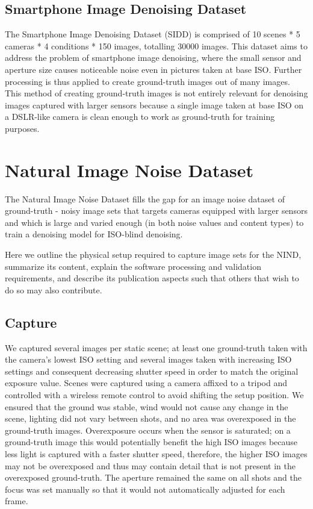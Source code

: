 \subsection{Smartphone Image Denoising Dataset}
The Smartphone Image Denoising Dataset (SIDD) \cite{sidd} is comprised of 10 scenes * 5 cameras * 4 conditions * 150 images, totalling 30000 images. This dataset aims to address the problem of smartphone image denoising, where the small sensor and aperture size causes noticeable noise even in pictures taken at base ISO. Further processing is thus applied to create ground-truth images out of many images. This method of creating ground-truth images is not entirely relevant for denoising images captured with larger sensors because a single image taken at base ISO on a DSLR-like camera is clean enough to work as ground-truth for training purposes.
%
\section{Natural Image Noise Dataset}

The Natural Image Noise Dataset fills the gap for an image noise dataset of ground-truth - noisy image sets that targets cameras equipped with larger sensors and which is large and varied enough (in both noise values and content types) to train a denoising model for ISO-blind denoising.

Here we outline the physical setup required to capture image sets for the NIND, summarize its content, explain the software processing and validation requirements, and describe its publication aspects such that others that wish to do so may also contribute.
\subsection{Capture}
We captured several images per static scene; at least one ground-truth taken with the camera's lowest ISO setting and several images taken with increasing ISO settings and consequent decreasing shutter speed in order to match the original exposure value. Scenes were captured using a camera affixed to a tripod and controlled with a wireless remote control to avoid shifting the setup position. We ensured that the ground was stable, wind would not cause any change in the scene, lighting did not vary between shots, and no area was overexposed in the ground-truth images. Overexposure occurs when the sensor is saturated; on a ground-truth image this would potentially benefit the high ISO images because less light is captured with a faster shutter speed, therefore, the higher ISO images may not be overexposed and thus may contain detail that is not present in the overexposed ground-truth. The aperture remained the same on all shots and the focus was set manually so that it would not automatically adjusted for each frame.

